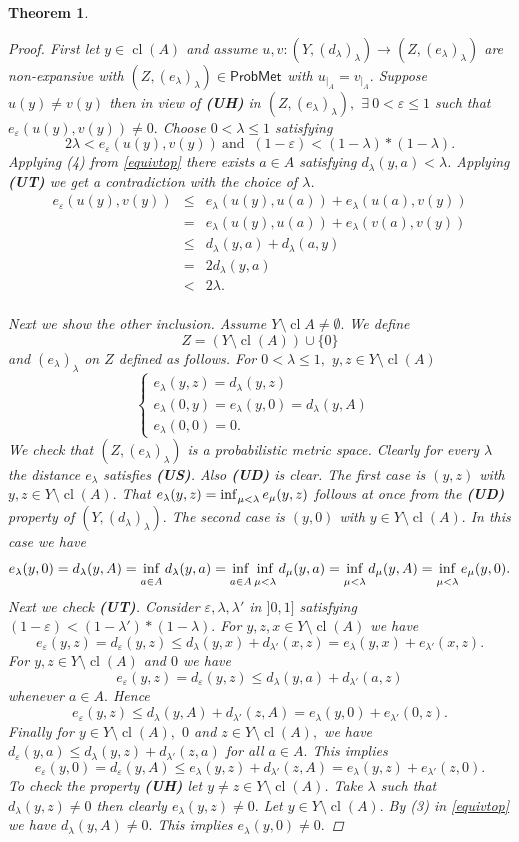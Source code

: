 \documentclass[12pt,a4paper]{amsart}
\theoremstyle{theorem}
\newtheorem{theorem}{Theorem}[section]
\theoremstyle{definition}
\newcommand{\PM}{\ensuremath{\mathsf{ProbMet_{}}}}
\renewcommand{\inf}{\myinf}
\DeclareMathOperator{\cl}{cl}
\DeclareMathOperator*{\myinf}{in\vphantom{p}f}
\newcommand{\ve}{\ensuremath{\varepsilon}}
\renewcommand{\l}{\ensuremath{\lambda}}
\def\rw{\rightarrow}
\begin{document}
{\begin{theorem}
\begin{proof}
First let $y \in \cl(A)$ and assume $u,v : (Y, (d_\l)_\l) \rw (Z, (e_\l)_\l)$ are non-expansive with $(Z, (e_\l)_\l) \in \PM$ with $u_{|_A} = v_{|_A}.$ Suppose $u(y) \not = v(y)$ then in view of {\bf(UH)} in $(Z, (e_\l)_\l),$ $\exists \  0 < \ve \leq 1$ such that $e_\ve(u(y) , v(y)) \not = 0.$
Choose $0 < \l \leq 1$ satisfying $$2 \l < e_\ve (u(y) , v(y)) \  \text{and } \ (1-\ve) < (1-\l) * (1-\l).$$
Applying (4) from \ref{equivtop} there exists $a \in A$ satisfying $d_\l(y,a) < \l$. Applying {\bf(UT)} we get a contradiction with the choice of $\l$.
 \begin{eqnarray*}
 e_\ve(u(y),v(y)) &\leq & e_\l(u(y), u(a)) + e_\l(u(a), v(y))\\
 &=&e_\l(u(y), u(a)) + e_\l(v(a), v(y))\\
 &\leq& d_\l(y,a) + d_\l(a,y)\\
 &=&2d_\l(y,a)\\
 &<& 2\l.\\
 \end{eqnarray*}
 
 Next we show the other inclusion. Assume $Y \setminus \cl{A} \not = \emptyset.$ 
 We define
 $$
 Z = (Y \setminus \cl (A)) \cup \{0\} 
 $$
 and $(e_\l)_\l $ on $Z$ defined as follows.
For $0 < \l \leq 1,$ $y,z \in Y \setminus \cl(A)$
 $$
  \begin{cases}  e_\l(y, z) = d_\l(y,z) \\
 e_\l(0,y) =  e_\l(y, 0) =d_\l(y,A)&\\ 
 e_\l(0,0) = 0. \end{cases}
$$
We check that $(Z, (e_\l)_\l)$ is a probabilistic metric space. Clearly for every $\l$ the distance $e_\l$ satisfies {\bf(US)}.
Also {\bf(UD)} is clear. The first case is $(y, z)$ with $y,z \in Y \setminus \cl(A).$
That $e_\l (y, z) = \inf_{\mu < \l} e_\mu(y, z) $ follows at once from the {\bf(UD)} property of $(Y, (d_\l)_\l).$ The second case is $(y, 0)$ with $y \in Y \setminus \cl(A).$ In this case we have
$$e_\l(y, 0) = d_\l(y,A)= \inf_{a \in A}d_\l(y,a) = \inf_{a \in A} \inf_{\mu < \l} d_\mu (y,a) = \inf_{\mu < \l} d_\mu(y,A)=  \inf_{\mu < \l} e_\mu(y, 0).$$
Next we check {\bf(UT)}. Consider $\ve, \l, \l'$ in $]0,1]$ satisfying $(1-\ve) < (1-\l') * (1-\l).$
For $y,z,x \in Y \setminus \cl(A)$ we have 
$$
e_\ve(y,z) = d_\ve(y,z) \leq d_\l(y,x) +d_{\l'}(x,z) = e_\l(y,x) +e_{\l'}(x,z).
$$
For $y,z \in Y \setminus \cl(A)$ and $0$ we have
$$
e_\ve(y,z) = d_\ve(y,z) \leq d_\l(y,a) +d_{\l'}(a,z) 
$$
whenever $a \in A.$ Hence 
$$
e_\ve(y,z)  \leq d_\l(y,A) +d_{\l'}(z,A) = e_\l(y,0) +e_{\l'}(0,z).
$$
Finally for $y\in Y \setminus \cl(A),$ $0$ and $z\in Y \setminus \cl(A),$  we have $d_\ve(y,a) \leq d_\l(y,z) + d_{\l'} (z,a)$ for all $a \in A.$ This implies
$$
e_\ve(y,0) = d_\ve(y,A) \leq e_\l(y,z) + d_{\l'} (z,A) = e_\l(y,z) + e_{\l'} (z,0).
$$
To check the property {\bf(UH)} let $y \not =z \in Y \setminus \cl(A)$. Take $\l$ such that $d_\l(y,z) \not = 0$ then clearly $e_\l(y,z) \not = 0.$
Let $y \in Y \setminus \cl(A).$ By (3) in \ref{equivtop} we have $d_\l(y,A) \not = 0.$ This implies $e_\l(y,0) \not = 0.$


\end{proof}
\end{theorem}}
\end{document}

